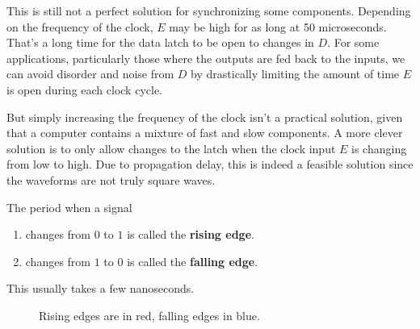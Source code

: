   This is still not a perfect solution for synchronizing some components. Depending on the frequency of the clock, $E$ may be high for as long at 50 microseconds. That's a long time for the data latch to be open to changes in $D$. For some applications, particularly those where the outputs are fed back to the inputs, we can avoid disorder and noise from $D$ by drastically limiting the amount of time $E$ is open during each clock cycle. 
  
  But simply increasing the frequency of the clock isn't a practical solution, given that a computer contains a mixture of fast and slow components. A more clever solution is to only allow changes to the latch when the clock input $E$ is changing from low to high. Due to propagation delay, this is indeed a feasible solution since the waveforms are not truly square waves. 

  \begin{definition}
    \label{def:rising-falling-edge}
    The period when a signal 
    \begin{enumerate}
      \item changes from $0$ to $1$ is called the \textbf{rising edge}. 
      \item changes from $1$ to $0$ is called the \textbf{falling edge}. 
    \end{enumerate}
    This usually takes a few nanoseconds. 

    \begin{figure}[H]
      \centering 
      \caption{Rising edges are in red, falling edges in blue.}
    \end{figure}
  \end{definition}

